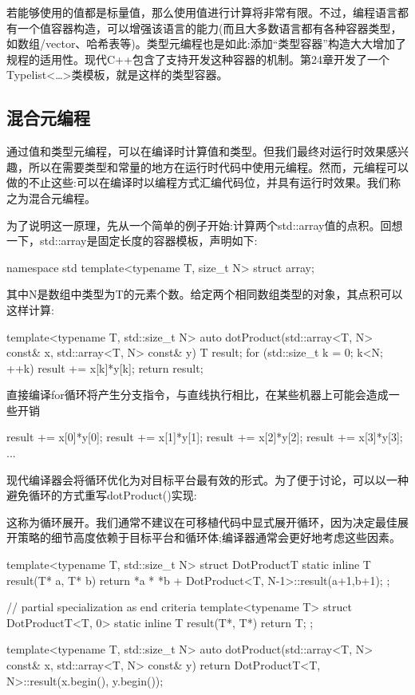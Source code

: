 若能够使用的值都是标量值，那么使用值进行计算将非常有限。不过，编程语言都有一个值容器构造，可以增强该语言的能力(而且大多数语言都有各种容器类型，如数组/vector、哈希表等)。类型元编程也是如此:添加“类型容器”构造大大增加了规程的适用性。现代C++包含了支持开发这种容器的机制。第24章开发了一个Typelist<…>类模板，就是这样的类型容器。

\subsection{混合元编程}

通过值和类型元编程，可以在编译时计算值和类型。但我们最终对运行时效果感兴趣，所以在需要类型和常量的地方在运行时代码中使用元编程。然而，元编程可以做的不止这些:可以在编译时以编程方式汇编代码位，并具有运行时效果。我们称之为混合元编程。

为了说明这一原理，先从一个简单的例子开始:计算两个std::array值的点积。回想一下，std::array是固定长度的容器模板，声明如下:

\begin{cpp}
namespace std {
	template<typename T, size_t N> struct array;
}
\end{cpp}

其中N是数组中类型为T的元素个数。给定两个相同数组类型的对象，其点积可以这样计算:

\begin{cpp}
template<typename T, std::size_t N>
auto dotProduct(std::array<T, N> const& x, std::array<T, N> const& y)
{
	T result{};
	for (std::size_t k = 0; k<N; ++k) {
		result += x[k]*y[k];
	}
	return result;
}
\end{cpp}

直接编译for循环将产生分支指令，与直线执行相比，在某些机器上可能会造成一些开销

\begin{cpp}
result += x[0]*y[0];
result += x[1]*y[1];
result += x[2]*y[2];
result += x[3]*y[3];
...
\end{cpp}

现代编译器会将循环优化为对目标平台最有效的形式。为了便于讨论，可以以一种避免循环的方式重写dotProduct()实现:

\begin{notice}这称为循环展开。我们通常不建议在可移植代码中显式展开循环，因为决定最佳展开策略的细节高度依赖于目标平台和循环体;编译器通常会更好地考虑这些因素。
\end{notice}

\begin{cpp}
template<typename T, std::size_t N>
struct DotProductT {
	static inline T result(T* a, T* b) {
		return *a * *b + DotProduct<T, N-1>::result(a+1,b+1);
	}
};

// partial specialization as end criteria
template<typename T>
struct DotProductT<T, 0> {
	static inline T result(T*, T*) {
		return T{};
	}
};

template<typename T, std::size_t N>
auto dotProduct(std::array<T, N> const& x,
				std::array<T, N> const& y)
{
	return DotProductT<T, N>::result(x.begin(), y.begin());
}
\end{cpp}

